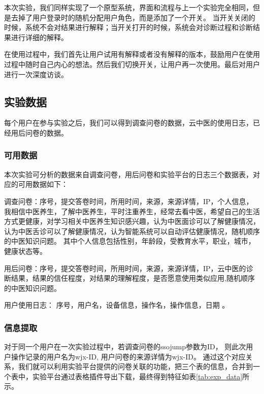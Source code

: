 本次实验，我们同样实现了一个原型系统，界面和流程与上一个实验完全相同，但是去掉了用户登录时的随机分配用户角色，而是添加了一个开关。
当开关关闭的时候，系统不会对结果进行解释；当开关打开的时候，系统会对诊断过程和诊断结果进行详细的解释。

在使用过程中，我们首先让用户试用有解释或者没有解释的版本，鼓励用户在使用过程中随时自己内心的想法。然后我们切换开关，让用户再一次使用。最后对用户进行一次深度访谈。

\subsection{实验数据}
每个用户在参与实验之后，我们可以得到调查问卷的数据，云中医的使用日志，已经用后问卷的数据。

\subsubsection{可用数据}
本次实验可分析的数据来自调查问卷，用后问卷和实验平台的日志三个数据表，对应的可用数据如下：

调查问卷：序号，提交答卷时间，所用时间，来源，来源详情，IP，个人信息，我相信中医养生，了解中医养生，平时注重养生，经常去看中医，希望自己的生活方式更健康，对学习相关中医养生知识感兴趣，认为中医面诊可以了解健康情况，认为中医舌诊可以了解健康情况，认为智能系统可以自动评估健康情况，随机顺序的中医知识问题。
其中个人信息包括性别，年龄段，受教育水平，职业，城市，健康状态等。

用后问卷：序号，提交答卷时间，所用时间，来源，来源详情，IP，云中医的诊断结果，结果的信任程度，对结果的理解程度，是否愿意使用类似应用,随机顺序的中医知识问题。

用户使用日志： 序号，用户名，设备信息，操作名，操作信息，日期 。

\subsubsection{信息提取}
对于同一个用户在一次实验过程中，若调查问卷的ssojump参数为ID， 则此次用户操作记录的用户名为wjx-ID, 用户问卷的来源详情为wjx-ID。 
通过这个对应关系，我们就可以利用实验平台提供的问卷关联的功能，把三个表的信息，合并到一个表中，实验平台通过表格插件导出下载，最终得到特征如表\ref{tab:exp_data}所示。


